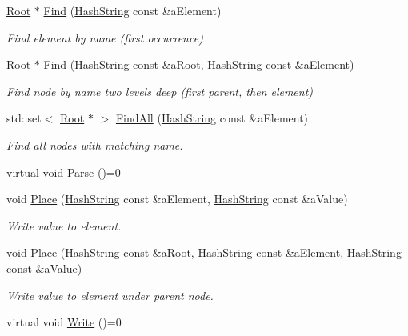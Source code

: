 \begin{DoxyCompactItemize}
\hyperlink{classRoot}{Root} $\ast$ \hyperlink{classParser_aab398982018413441cb67d384f9a60ff}{Find} (\hyperlink{classHashString}{Hash\+String} const \&a\+Element)
\begin{DoxyCompactList}\small\item\em Find element by name (first occurrence) \end{DoxyCompactList}\item 
\hyperlink{classRoot}{Root} $\ast$ \hyperlink{classParser_a1db926622d78bc47b41c5c1a81325368}{Find} (\hyperlink{classHashString}{Hash\+String} const \&a\+Root, \hyperlink{classHashString}{Hash\+String} const \&a\+Element)
\begin{DoxyCompactList}\small\item\em Find node by name two levels deep (first parent, then element) \end{DoxyCompactList}\item 
std\+::set$<$ \hyperlink{classRoot}{Root} $\ast$ $>$ \hyperlink{classParser_ae97696a8252b3b1bc11fcafb6b83b545}{Find\+All} (\hyperlink{classHashString}{Hash\+String} const \&a\+Element)
\begin{DoxyCompactList}\small\item\em Find all nodes with matching name. \end{DoxyCompactList}\item 
virtual void \hyperlink{classParser_ac4a951ef940a816dde511d7f5c173ab9}{Parse} ()=0
\item 
void \hyperlink{classParser_ac1a64b61a7db025e676b2101b988f358}{Place} (\hyperlink{classHashString}{Hash\+String} const \&a\+Element, \hyperlink{classHashString}{Hash\+String} const \&a\+Value)
\begin{DoxyCompactList}\small\item\em Write value to element. \end{DoxyCompactList}\item 
void \hyperlink{classParser_a3854ac813a7208b97558048eca223368}{Place} (\hyperlink{classHashString}{Hash\+String} const \&a\+Root, \hyperlink{classHashString}{Hash\+String} const \&a\+Element, \hyperlink{classHashString}{Hash\+String} const \&a\+Value)
\begin{DoxyCompactList}\small\item\em Write value to element under parent node. \end{DoxyCompactList}\item 
virtual void \hyperlink{classParser_a925ea4ac32e6a4feb78fe83d81a8ac84}{Write} ()=0
\end{DoxyCompactItemize}
